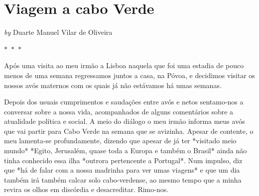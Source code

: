 \documentclass{article}
\begin{document}
\newpage
\section{Viagem a cabo Verde}


    
        \textit{by} Duarte Manuel Vilar de Oliveira
    


 
    

    $\ast$~$\ast$~$\ast$  


    \begin{center}
        \begin{minipage}{0.9\textwidth}
            \setlength{\parskip}{0.2cm}
            \setlength{\parindent}{0cm}
            \fontsize{12pt}{14pt}\selectfont
            


Após uma visita ao meu irmão a Lisboa naquela que foi uma estadia de
pouco menos de uma semana regressamos juntos a casa, na Póvoa, e
decidimos visitar os nossos avós maternos com os quais já não estávamos
há umas semanas.

Depois dos usuais cumprimentos e saudações entre avós e netos
sentamo-nos a conversar sobre a nossa vida, acompanhados de alguns
comentários sobre a atualidade política e social. A meio do diálogo o
meu irmão informa meus avós que vai partir para Cabo Verde na semana que
se avizinha. Apesar de contente, o meu lamenta-se profundamente, dizendo
que apesar de já ter *visitado meio mundo* *Egito, Jerusalém, quase toda
a Europa e também o Brasil* ainda não tinha conhecido essa ilha *outrora
pertencente a Portugal*. Num impulso, diz que *há de falar com a nossa
madrinha para ver umas viagens* e que um dia também irá também calcar
solo cabo-verdense, ao mesmo tempo que a minha revira os olhos em
discórdia e desacreditar. Rimo-nos.

        \end{minipage}
    \end{center}
\end{document}

